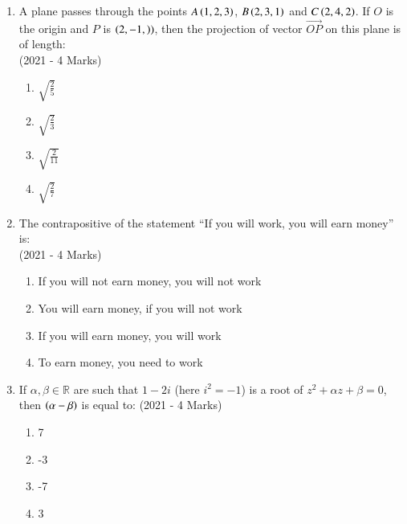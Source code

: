 \documentclass[journal]{IEEEtran}
\begin{document}
    \begin{enumerate}
    \item{
          	A plane passes through the points $A\left(1,2,3\right)$, $B\left(2,3,1\right)$ and $C\left(2,4,2\right)$. If $O$ is the origin and $P$ is $\left(2,-1,\right))$, then the projection of vector $\overrightarrow{OP}$ on this plane is of length:\\ \text{  }\hfill
                {(2021 - 4 Marks)}
            \begin{multicols}{4}
				\begin{enumerate}
					\item $\sqrt{\frac{2}{5}}$
					
					\item $\sqrt{\frac{2}{3}}$
					
					\item $\sqrt{\frac{2}{11}}$
					
					\item $\sqrt{\frac{2}{7}}$
				\end{enumerate}
			\end{multicols}
            }
    \item{
           	The contrapositive of the statement “If you will work, you will earn money” is: \\ \text{ }\hfill
                {(2021 - 4 Marks)}
                \begin{enumerate}
                   	\item If you will not earn money, you will not work
                   	\item You will earn money, if you will not work
                   	\item If you will earn money, you will work
                   	\item To earn money, you need to work
                \end{enumerate}
        }
\item{
        	
        	If $\alpha, \beta \in \mathbb{R}$ are such that $1 - 2i$ (here $i^2 = -1$) is a root of $z^2 + \alpha z + \beta = 0$, then $\left(\alpha - \beta\right)$ is equal to:
        	\hfill
        	{(2021 - 4 Marks)}
        	\begin{multicols}{4}
        		\begin{enumerate}
        			\item 7
        			\item -3
        			\item -7
        			\item 3
        		\end{enumerate}
        	\end{multicols}
        	
}
\end{enumerate}
\end{document}
